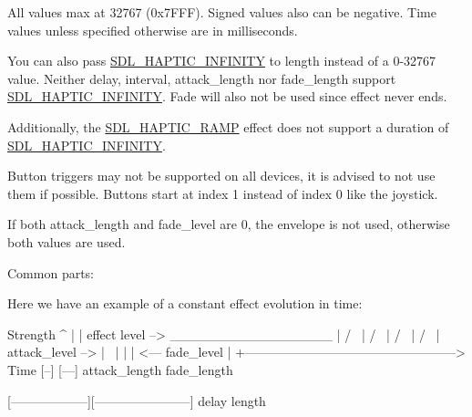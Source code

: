 All values max at 32767 (0x7\+F\+FF). Signed values also can be negative. Time values unless specified otherwise are in milliseconds.

You can also pass \mbox{\hyperlink{_s_d_l__haptic_8h_a648896e9e14cb27fa8a4b6632d3f3882}{S\+D\+L\+\_\+\+H\+A\+P\+T\+I\+C\+\_\+\+I\+N\+F\+I\+N\+I\+TY}} to length instead of a 0-\/32767 value. Neither delay, interval, attack\+\_\+length nor fade\+\_\+length support \mbox{\hyperlink{_s_d_l__haptic_8h_a648896e9e14cb27fa8a4b6632d3f3882}{S\+D\+L\+\_\+\+H\+A\+P\+T\+I\+C\+\_\+\+I\+N\+F\+I\+N\+I\+TY}}. Fade will also not be used since effect never ends.

Additionally, the \mbox{\hyperlink{_s_d_l__haptic_8h_af10eb937a64a8f602e9c46682ac0d868}{S\+D\+L\+\_\+\+H\+A\+P\+T\+I\+C\+\_\+\+R\+A\+MP}} effect does not support a duration of \mbox{\hyperlink{_s_d_l__haptic_8h_a648896e9e14cb27fa8a4b6632d3f3882}{S\+D\+L\+\_\+\+H\+A\+P\+T\+I\+C\+\_\+\+I\+N\+F\+I\+N\+I\+TY}}.

Button triggers may not be supported on all devices, it is advised to not use them if possible. Buttons start at index 1 instead of index 0 like the joystick.

If both attack\+\_\+length and fade\+\_\+level are 0, the envelope is not used, otherwise both values are used.

Common parts\+: 
\begin{DoxyCode}{0}
\DoxyCodeLine{\textcolor{comment}{// Replay - All effects have this}}
\DoxyCodeLine{}
\DoxyCodeLine{\textcolor{comment}{// Trigger - All effects have this}}
\DoxyCodeLine{}
\DoxyCodeLine{\textcolor{comment}{// Envelope - All effects except condition effects have this}}
\end{DoxyCode}


Here we have an example of a constant effect evolution in time\+: \begin{DoxyVerb}Strength
^
|
|    effect level -->  _________________
|                     /                 \
|                    /                   \
|                   /                     \
|                  /                       \
| attack_level --> |                        \
|                  |                        |  <---  fade_level
|
+--------------------------------------------------> Time
                   [--]                 [---]
                   attack_length        fade_length

[------------------][-----------------------]
delay               length
\end{DoxyVerb}


